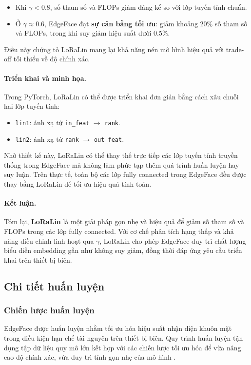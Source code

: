 \begin{itemize}
    \item Khi $\gamma < 0.8$, số tham số và FLOPs giảm đáng kể so với lớp tuyến tính chuẩn.
    \item Ở $\gamma \approx 0.6$, EdgeFace đạt \textbf{sự cân bằng tối ưu}: giảm khoảng $20\%$ số tham số và FLOPs, trong khi suy giảm hiệu suất dưới $0.5\%$.
\end{itemize}
Điều này chứng tỏ LoRaLin mang lại khả năng nén mô hình hiệu quả với trade-off tối thiểu về độ chính xác.

\paragraph{Triển khai và minh họa.} 
Trong PyTorch, LoRaLin có thể được triển khai đơn giản bằng cách xâu chuỗi hai lớp tuyến tính:
\begin{itemize}
    \item \texttt{lin1}: ánh xạ từ \texttt{in\_feat} $\to$ \texttt{rank}.
    \item \texttt{lin2}: ánh xạ từ \texttt{rank} $\to$ \texttt{out\_feat}.
\end{itemize}
Nhờ thiết kế này, LoRaLin có thể thay thế trực tiếp các lớp tuyến tính truyền thống trong EdgeFace mà không làm phức tạp thêm quá trình huấn luyện hay suy luận. Trên thực tế, toàn bộ các lớp fully connected trong EdgeFace đều được thay bằng LoRaLin để tối ưu hiệu quả tính toán.

\paragraph{Kết luận.} 
Tóm lại, \textbf{LoRaLin} là một giải pháp gọn nhẹ và hiệu quả để giảm số tham số và FLOPs trong các lớp fully connected. Với cơ chế phân tích hạng thấp và khả năng điều chỉnh linh hoạt qua $\gamma$, LoRaLin cho phép EdgeFace duy trì chất lượng biểu diễn embedding gần như không suy giảm, đồng thời đáp ứng yêu cầu triển khai trên thiết bị biên.

\subsection{Chi tiết huấn luyện}
\subsubsection{Chiến lược huấn luyện}

EdgeFace được huấn luyện nhằm tối ưu hóa hiệu suất nhận diện khuôn mặt trong điều kiện hạn chế tài nguyên trên thiết bị biên. 
Quy trình huấn luyện tận dụng tập dữ liệu quy mô lớn kết hợp với các chiến lược tối ưu hóa để vừa nâng cao độ chính xác, vừa duy trì tính gọn nhẹ của mô hình \cite{george2024edgeface}.

